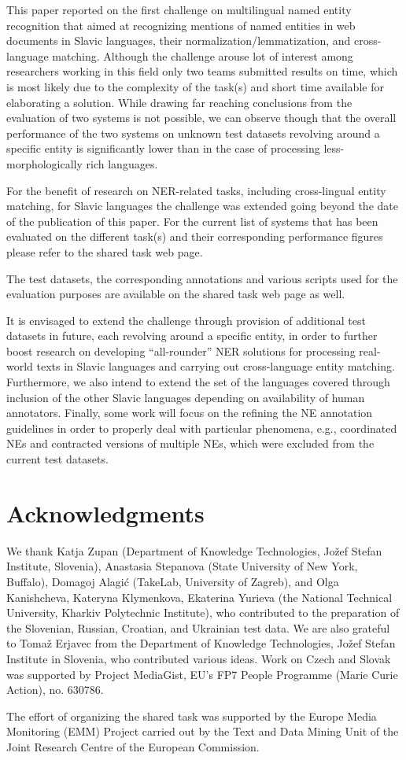 \documentclass[11pt]{article}
\begin{document}
This paper reported on the first challenge on multilingual named entity recognition that aimed at recognizing 
mentions of named entities in web documents in Slavic languages, their normalization/lemmatization, and 
cross-language matching. Although the challenge arouse lot of interest among researchers working 
in this field only two teams submitted results on time, which is most likely due to the complexity
of the task(s) and short time available for elaborating a solution. While drawing far reaching
conclusions from the evaluation of two systems is not possible, we can observe though that 
the overall performance of the two systems on unknown test datasets revolving around a specific entity
is significantly lower than in the case of processing less-morphologically rich languages. 

For the benefit of research on NER-related tasks, including cross-lingual entity matching, for Slavic
languages the challenge was extended going beyond the date of the publication of this paper. For the current 
list of systems that has been evaluated on the different task(s) and their corresponding performance figures
please refer to the shared task web page. 

The test datasets, the corresponding annotations and various scripts used for the evaluation purposes 
are available on the shared task web page as well.

It is envisaged to extend the challenge through provision of additional test datasets in future, each revolving
around a specific entity, in order to further boost research on developing ``all-rounder'' NER solutions for 
processing real-world texts in Slavic languages and carrying out cross-language entity matching. Furthermore, 
we also intend to extend the set of the languages covered through inclusion of the other Slavic languages 
depending on availability of human annotators. Finally, some work will focus on the refining the NE annotation 
guidelines in order to properly deal with particular phenomena, e.g.,  coordinated NEs and contracted versions 
of multiple NEs, which were excluded from the current test datasets.


\section*{Acknowledgments}


We thank Katja Zupan (Department of Knowledge Technologies, Jožef Stefan
Institute, Slovenia), Anastasia Stepanova (State University of New York,
Buffalo), Domagoj Alagić (TakeLab, University of Zagreb), and Olga
Kanishcheva, Kateryna Klymenkova, Ekaterina Yurieva (the National
Technical University, Kharkiv Polytechnic Institute), who contributed to
the preparation of the Slovenian, Russian, Croatian, and Ukrainian test
data.  
%
We are also grateful to Tomaž Erjavec from the Department of Knowledge
Technologies, Jožef Stefan Institute in Slovenia, who contributed various
ideas.
%
Work on Czech and Slovak was supported by Project MediaGist, EU's FP7
People Programme (Marie Curie Action), no. 630786.

The effort of organizing the shared task was supported by the Europe Media Monitoring (EMM) 
Project carried out by the Text and Data Mining Unit of the Joint Research Centre of the 
European Commission.



\end{document}
